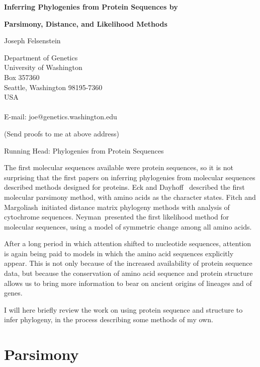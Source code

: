 \documentclass[12pt]{article}
\def\fn{\footnotemark\ }
\begin{document}
\centerline{\bf Inferring Phylogenies from Protein Sequences by}
\bigskip

\centerline{\bf Parsimony, Distance, and Likelihood Methods}
\vfill

\centerline{Joseph Felsenstein}
\vfill

\begin{center}
Department of Genetics\\
University of Washington\\
Box 357360\\
Seattle, Washington 98195-7360\\
USA\\
~\\
E-mail: joe@genetics.washington.edu
\end{center}
\vfill
(Send proofs to me at above address)
\vfill


\centerline{Running Head: Phylogenies from Protein Sequences}
\vfill

\newpage
{}
\pagestyle{headings}

The first molecular sequences available were protein sequences, so it is not
surprising that the first papers on inferring phylogenies from molecular
sequences described methods designed for proteins.  Eck and Dayhoff\fn
described the first molecular parsimony method, with amino acids as the
character
states.  Fitch and Margoliash\fn initiated distance matrix phylogeny
methods with analysis of cytochrome sequences.  Neyman\fn  presented the
first likelihood method for molecular sequences, using a model of symmetric
change among all amino acids.

After a long period in which attention shifted to nucleotide sequences,
attention is again being paid to models in which the amino acid sequences
explicitly appear.  This is not only because of the increased availability
of protein sequence data, but because the conservation of amino acid
sequence and protein structure allows us
to bring more information to bear on ancient origins of lineages and of genes.

I will here briefly review the work on using protein sequence and structure to
infer phylogeny, in the process describing some methods of my own.

\section* {Parsimony}
\end{document}
